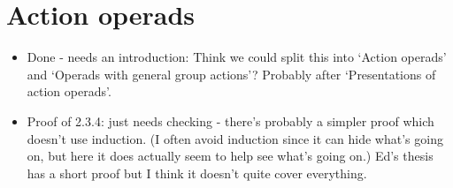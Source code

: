 \documentclass{amsart}
\begin{document}
\section{Action operads}
\begin{itemize}
	\item Done - needs an introduction: Think we could split this into `Action operads' and `Operads with general group actions'? Probably after `Presentations of action operads'.
\item Proof of 2.3.4: just needs checking - there's probably a simpler proof which doesn't use induction. (I often avoid induction since it can hide what's going on, but here it does actually seem to help see what's going on.) Ed's thesis has a short proof but I think it doesn't quite cover everything.

\end{itemize}
\end{document}

